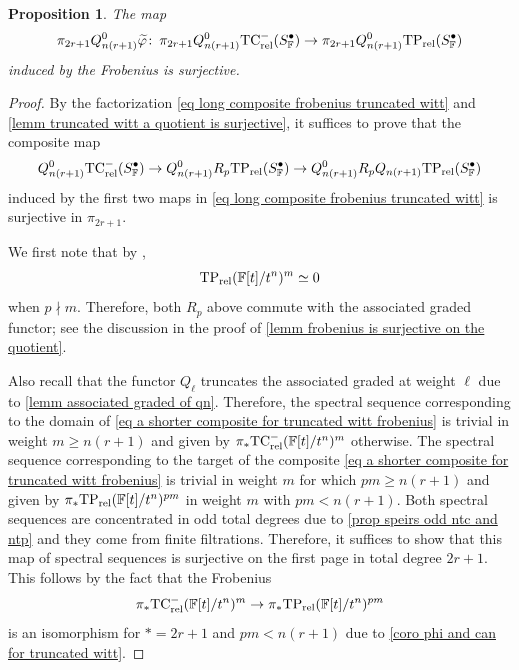 \documentclass[english,10pt]{amsart}
\newcommand{\rel}{\textup{rel}}
\newcommand{\field}{\mathbb{F}}
\newtheorem{prop}{Proposition}[section]
\theoremstyle{definition}
\numberwithin{equation}{section}
\newcommand{\rntc}{\mathrm{TC}_{\rel}^{-}}
\newcommand{\rtp}{\mathrm{TP}_{\rel}}
\newcommand{\pis}{\pi_*}
\def\co{\colon\thinspace}
\begin{document}
\begin{prop}\label{prop truncated witt surjective frobenius}
The map
\[\pi_{2r+1} Q_{n(r+1)}^0\widetilde{\varphi} \co \pi_{2r+1}Q_{n(r+1)}^0\rntc(S_{\field}^{\bullet}) \to \pi_{2r+1}Q_{n(r+1)}^0\rtp(S_{\field}^{\bullet})\]
induced by the Frobenius is surjective. 
\end{prop}
\begin{proof}
By the factorization  \eqref{eq long composite frobenius truncated witt} and \autoref{lemm truncated witt a quotient is surjective}, it suffices to prove that the composite map 
\begin{equation}\label{eq a shorter composite for truncated witt frobenius}
Q_{n(r+1)}^0\rntc(S_{\field}^{\bullet}) \to Q_{n(r+1)}^0R_p\rtp(S_{\field}^{\bullet}) \to Q_{n(r+1)}^0 R_p Q_{n(r+1)}\rtp(S_{\field}^{\bullet})\end{equation}
induced by the first two maps in \eqref{eq long composite frobenius truncated witt} is surjective in $\pi_{2r+1}$. 

We first note that by \cite[Propositions 12 and 13]{speirs2020truncatedpolynomial}, \begin{equation}\label{eq truncated witt tate vanish prime to p}
\rtp(\field[t]/t^n)^m \simeq 0 
\end{equation}
when  $p \nmid m$. Therefore, both $R_p$ above commute with the associated graded functor; see the discussion in the proof of \autoref{lemm frobenius is surjective on the quotient}.

 Also recall that the functor $Q_{\ell}$ truncates the associated graded at  weight $\ell$ due to \autoref{lemm associated graded of qn}. Therefore, the spectral sequence corresponding to the domain of \eqref{eq a shorter composite for truncated witt frobenius} is trivial in weight $m\geq n(r+1)$ and given by $\pis \rntc(\field[t]/t^n)^m$ otherwise.
 The  spectral sequence corresponding to the target of the composite \eqref{eq a shorter composite for truncated witt frobenius} is trivial in weight $m$ for which $pm\geq n(r+1)$ and given by $\pis \rtp(\field[t]/t^n)^{pm}$ in weight $m$ with $pm<n(r+1)$.  Both  spectral sequences are concentrated in odd total degrees due to \autoref{prop speirs odd ntc and ntp} and they come from finite filtrations. Therefore, it suffices to show that this map of spectral sequences is surjective on the first page in total degree $2r+1$. This follows by the fact that the Frobenius 
\begin{equation}\label{eq map of spectral sequences for frobenius for truncated witt}
\pis \rntc(\field[t]/t^n)^m \to \pis \rtp(\field[t]/t^n)^{pm}\end{equation}
is an isomorphism for $* = 2r+1$ and $pm<n(r+1)$ due to \autoref{coro phi and can for truncated witt}.
\end{proof}
\end{document}
